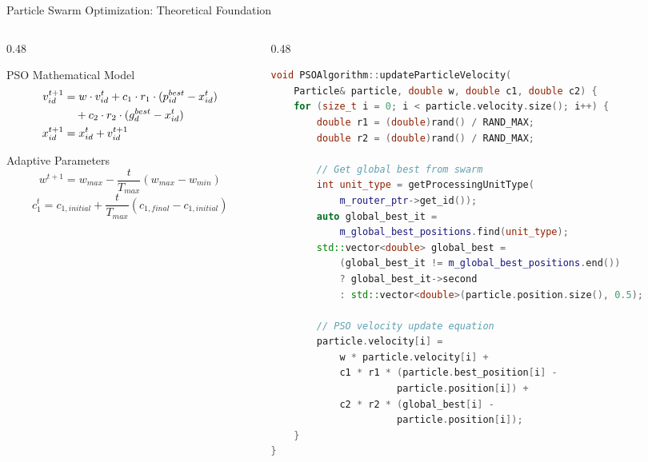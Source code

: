 \documentclass[10pt,aspectratio=169]{beamer}
\begin{document}
\begin{frame}[fragile]{Particle Swarm Optimization: Theoretical Foundation}
    \begin{columns}[T]
        \begin{column}{0.48\textwidth}
            \begin{block}{PSO Mathematical Model}
                \begin{align}
                    v_{id}^{t+1} &= w \cdot v_{id}^{t} + c_1 \cdot r_1 \cdot (p_{id}^{best} - x_{id}^{t}) \notag \\
                    &\quad + c_2 \cdot r_2 \cdot (g_{d}^{best} - x_{id}^{t}) \\
                    x_{id}^{t+1} &= x_{id}^{t} + v_{id}^{t+1}
                \end{align}
            \end{block}
            
            \begin{block}{Adaptive Parameters}
                \begin{equation}
                    w^{t+1} = w_{max} - \frac{t}{T_{max}}(w_{max} - w_{min})
                \end{equation}
                \begin{equation}
                    c_1^t = c_{1,initial} + \frac{t}{T_{max}}(c_{1,final} - c_{1,initial})
                \end{equation}
            \end{block}
        \end{column}
        
        \begin{column}{0.48\textwidth}
            \begin{lstlisting}[language=C++,caption=PSO Implementation (PSOAlgorithm.cc:106-134)]
void PSOAlgorithm::updateParticleVelocity(
    Particle& particle, double w, double c1, double c2) {
    for (size_t i = 0; i < particle.velocity.size(); i++) {
        double r1 = (double)rand() / RAND_MAX;
        double r2 = (double)rand() / RAND_MAX;
        
        // Get global best from swarm
        int unit_type = getProcessingUnitType(
            m_router_ptr->get_id());
        auto global_best_it = 
            m_global_best_positions.find(unit_type);
        std::vector<double> global_best = 
            (global_best_it != m_global_best_positions.end()) 
            ? global_best_it->second 
            : std::vector<double>(particle.position.size(), 0.5);
        
        // PSO velocity update equation
        particle.velocity[i] = 
            w * particle.velocity[i] + 
            c1 * r1 * (particle.best_position[i] - 
                      particle.position[i]) +
            c2 * r2 * (global_best[i] - 
                      particle.position[i]);
    }
}
            \end{lstlisting}
        \end{column}
    \end{columns}
\end{frame}
\end{document}
